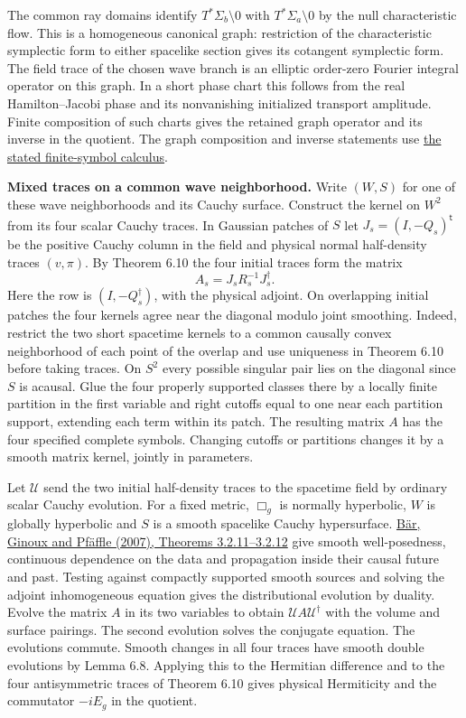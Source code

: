 \documentclass[
  english,
  11pt,
  reqno]{amsart}
\makeatletter
\newcommand{\paperleadspace}{%
  \par\if@nobreak\else
    \addpenalty{\@secpenalty}\addvspace{.5\baselineskip}%
  \fi}
\newcommand{\paperleadin}[1]{%
  \ifvmode\paperleadspace\fi
  \textbf{#1}}
\makeatother
\begin{document}
The common ray domains identify \(T^*\Sigma_b\setminus0\) with
\(T^*\Sigma_a\setminus0\) by the null characteristic flow. This is a
homogeneous canonical graph: restriction of the characteristic
symplectic form to either spacelike section gives its cotangent
symplectic form. The field trace of the chosen wave branch is an
elliptic order-zero Fourier integral operator on this graph. In a short
phase chart this follows from the real Hamilton--Jacobi phase and its
nonvanishing initialized transport amplitude. Finite composition of such
charts gives the retained graph operator and its inverse in the
quotient. The graph composition and inverse statements use
\hyperref[lem:online-finite-symbol-family-calculus]{the stated
finite-symbol calculus}.

\paperleadin{Mixed traces on a common wave neighborhood.} Write \((W,S)\) for
one of these wave neighborhoods and its Cauchy surface. Construct the
kernel on \(W^2\) from its four scalar Cauchy traces. In Gaussian
patches of \(S\) let \(J_s=(I,-Q_s)^{\mathsf t}\) be the positive Cauchy
column in the field and physical normal half-density traces \((v,\pi)\).
By Theorem 6.10 the four initial traces form the matrix \[
A_s=J_s R_s^{-1}J_s^\dagger .
\] Here the row is \((I,-Q_s^\dagger)\), with the physical adjoint. On
overlapping initial patches the four kernels agree near the diagonal
modulo joint smoothing. Indeed, restrict the two short spacetime kernels
to a common causally convex neighborhood of each point of the overlap
and use uniqueness in Theorem 6.10 before taking traces. On \(S^2\)
every possible singular pair lies on the diagonal since \(S\) is
acausal. Glue the four properly supported classes there by a locally
finite partition in the first variable and right cutoffs equal to one
near each partition support, extending each term within its patch. The
resulting matrix \(A\) has the four specified complete symbols. Changing
cutoffs or partitions changes it by a smooth matrix kernel, jointly in
parameters.

Let \(\mathcal U\) send the two initial half-density traces to the
spacetime field by ordinary scalar Cauchy evolution. For a fixed metric,
\(\Box_g\) is normally hyperbolic, \(W\) is globally hyperbolic and
\(S\) is a smooth spacelike Cauchy hypersurface.
\hyperref[ref-BarGinouxPfaffle2007]{Bär, Ginoux and Pfäffle (2007),
Theorems 3.2.11--3.2.12} give smooth well-posedness, continuous
dependence on the data and propagation inside their causal future and
past. Testing against compactly supported smooth sources and solving the
adjoint inhomogeneous equation gives the distributional evolution by
duality. Evolve the matrix \(A\) in its two variables to obtain
\(\mathcal U A\mathcal U^\dagger\) with the volume and surface pairings.
The second evolution solves the conjugate equation. The evolutions
commute. Smooth changes in all four traces have smooth double evolutions
by Lemma 6.8. Applying this to the Hermitian difference and to the four
antisymmetric traces of Theorem 6.10 gives physical Hermiticity and the
commutator \(-iE_g\) in the quotient.
\end{document}

